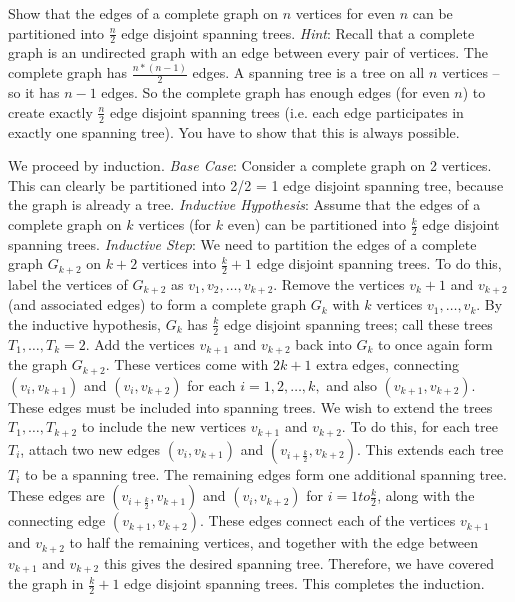 \question Show that the edges of a complete graph on $n$ vertices 
for even $n$ can be partitioned into $\frac{n}{2}$ edge disjoint 
spanning trees. \newline
\textit{Hint}: Recall that a complete graph is an undirected graph 
with an edge between every pair of vertices. The complete graph has 
$\frac{n * (n-1)}{2}$ edges. A spanning tree is a tree on all $n$ 
vertices -- so it has $n-1$ edges. So the complete graph has enough 
edges (for even $n$) to create exactly $\frac{n}{2}$ edge disjoint 
spanning trees (i.e. each edge participates in exactly one spanning 
tree). You have to show that this is always possible.

\begin{solution}[5in]
We proceed by induction.\newline
\textit{Base Case}: Consider a complete graph on 2 vertices. This 
can clearly be partitioned into 2/2 = 1 edge disjoint spanning tree, 
because the graph is already a tree.\newline
\textit{Inductive Hypothesis}: Assume that the edges of a complete 
graph on $k$ vertices (for $k$ even) can be partitioned into 
$\frac{k}{2}$ edge disjoint spanning trees.\newline
\textit{Inductive Step}: We need to partition the edges of a 
complete graph $G_{k+2}$ on $k+2$ vertices into $\frac{k}{2} +1$ 
edge disjoint spanning trees.\newline
To do this, label the vertices of $G_{k+2}$ as $v_1, v_2, \dotsc ,v_{k+2}$. 
Remove the vertices $v_k+1$ and $v_{k+2}$ (and associated edges) to 
form a complete graph $G_k$ with $k$ vertices $v_1, \dotsc, v_k$. 
By the inductive hypothesis, $G_k$ has $\frac{k}{2}$ edge disjoint 
spanning trees; call these trees $T_1, \dotsc ,T_k=2$.
Add the vertices $v_{k+1}$ and $v_{k+2}$ back into $G_k$ to once 
again form the graph $G_{k+2}$. These vertices come with $2k+1$ 
extra edges, connecting $(v_i,v_{k+1})$ and $(v_i,v_{k+2})$ for 
each $i = 1,2,\dotsc,k,$ and also
$(v_{k+1}, v_{k+2})$. These edges must be included into spanning trees.
We wish to extend the trees $T_1,\dotsc,T_{k+2}$ to include the new 
vertices $v_{k+1}$ and $v_{k+2}$. To do this, for each tree $T_i$, 
attach two new edges $(v_i,v_{k+1})$ and $(v_{i+\frac{k}{2}}, v_{k+2})$. 
This extends each tree $T_i$ to be a spanning tree.
The remaining edges form one additional spanning tree. These edges 
are $(v_{i+\frac{k}{2}}, v_{k+1})$ and $(v_i,v_{k+2})$ for $i =1 to 
\frac{k}{2}$, along with the connecting edge $(v_{k+1}, v_{k+2})$. 
These edges connect each of the vertices $v_{k+1}$ and $v_{k+2}$ to 
half the remaining vertices, and together with the edge between 
$v_{k+1}$ and $v_{k+2}$ this gives the desired spanning tree.
Therefore, we have covered the graph in $\frac{k}{2} +1$ edge disjoint 
spanning trees. This completes the induction.\newline


\end{solution}
